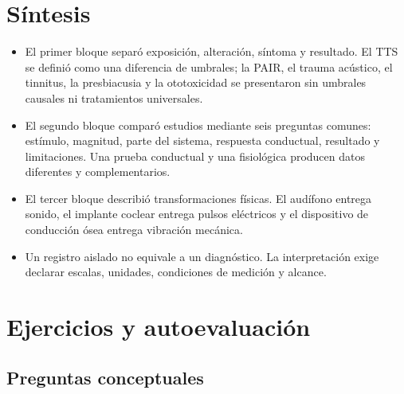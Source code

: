 \section{Síntesis}
\label{sec:u8-sintesis}

\begin{itemize}
    \item El primer bloque separó exposición, alteración, síntoma y resultado.
    El TTS se definió como una diferencia de umbrales; la PAIR, el trauma
    acústico, el tinnitus, la presbiacusia y la ototoxicidad se presentaron
    sin umbrales causales ni tratamientos universales.
    \item El segundo bloque comparó estudios mediante seis preguntas comunes:
    estímulo, magnitud, parte del sistema, respuesta conductual, resultado y
    limitaciones. Una prueba conductual y una fisiológica producen datos
    diferentes y complementarios.
    \item El tercer bloque describió transformaciones físicas. El audífono
    entrega sonido, el implante coclear entrega pulsos eléctricos y el
    dispositivo de conducción ósea entrega vibración mecánica.
    \item Un registro aislado no equivale a un diagnóstico. La interpretación
    exige declarar escalas, unidades, condiciones de medición y alcance.
\end{itemize}

\section{Ejercicios y autoevaluación}
\label{sec:u8-ejercicios}

\subsection*{Preguntas conceptuales}

